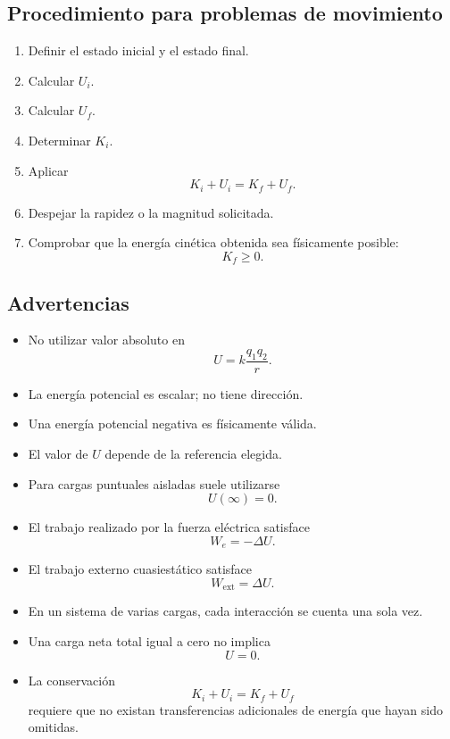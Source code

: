 \subsection{Procedimiento para problemas de movimiento}

\begin{enumerate}
    \item Definir el estado inicial y el estado final.
    \item Calcular \(U_i\).
    \item Calcular \(U_f\).
    \item Determinar \(K_i\).
    \item Aplicar
    \[
    K_i+U_i=K_f+U_f.
    \]
    \item Despejar la rapidez o la magnitud solicitada.
    \item Comprobar que la energía cinética obtenida sea físicamente posible:
    \[
    K_f\geq0.
    \]
\end{enumerate}


\subsection{Advertencias}

\begin{itemize}
    \item No utilizar valor absoluto en
    \[
    U=k\frac{q_1q_2}{r}.
    \]

    \item La energía potencial es escalar; no tiene dirección.

    \item Una energía potencial negativa es físicamente válida.

    \item El valor de \(U\) depende de la referencia elegida.

    \item Para cargas puntuales aisladas suele utilizarse
    \[
    U(\infty)=0.
    \]

    \item El trabajo realizado por la fuerza eléctrica satisface
    \[
    W_e=-\Delta U.
    \]

    \item El trabajo externo cuasiestático satisface
    \[
    W_{\text{ext}}=\Delta U.
    \]

    \item En un sistema de varias cargas, cada interacción se cuenta una sola vez.

    \item Una carga neta total igual a cero no implica
    \[
    U=0.
    \]

    \item La conservación
    \[
    K_i+U_i=K_f+U_f
    \]
    requiere que no existan transferencias adicionales de energía que hayan sido
    omitidas.
\end{itemize}


